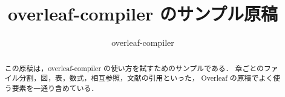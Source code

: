 \documentclass[a4paper,11pt]{ltjsarticle}
\title{overleaf-compiler のサンプル原稿}
\author{overleaf-compiler}
\date{}
\begin{document}
\maketitle

\begin{abstract}
  この原稿は，overleaf-compiler の使い方を試すためのサンプルである．
  章ごとのファイル分割，図，表，数式，相互参照，文献の引用といった，
  Overleaf の原稿でよく使う要素を一通り含めている．
\end{abstract}








\end{document}
